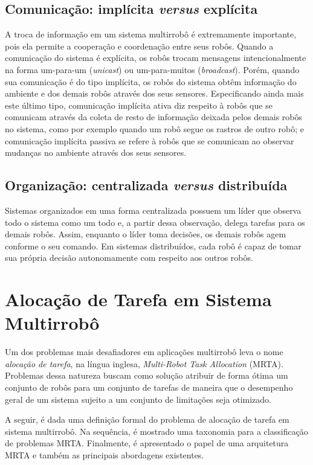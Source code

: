         \subsection{Comunicação: implícita \textit{versus} explícita}
            A troca de informação em um sistema multirrobô é extremamente importante, pois ela permite a cooperação e coordenação entre seus robôs. Quando a comunicação do sistema é explícita, os robôs trocam mensagens intencionalmente na forma um-para-um (\textit{unicast}) ou um-para-muitos (\textit{broadcast}). Porém, quando sua comunicação é do tipo implícita, os robôs do sistema obtêm informação do ambiente e dos demais robôs através dos seus sensores. Especificando ainda mais este último tipo, comunicação implícita ativa diz respeito à robôs que se comunicam através da coleta de resto de informação deixada pelos demais robôs no sistema, como por exemplo quando um robô segue os rastros de outro robô; e comunicação implícita passiva se refere à robôs que se comunicam ao observar mudanças no ambiente através dos seus sensores.
        
        \subsection{Organização: centralizada \textit{versus} distribuída}
            Sistemas organizados em uma forma centralizada possuem um líder que observa todo o sistema como um todo e, a partir dessa observação, delega tarefas para os demais robôs. Assim, enquanto o líder toma decisões, os demais robôs agem conforme o seu comando. Em sistemas distribuídos, cada robô é capaz de tomar sua própria decisão autonomamente com respeito aos outros robôs. 
    
    \section{Alocação de Tarefa em Sistema Multirrobô} \label{sec:mrta}
        Um dos problemas mais desafiadores em aplicações multirrobô leva o nome \textit{alocação de tarefa}, na língua inglesa, \textit{Multi-Robot Task Allocation} (MRTA). Problemas dessa natureza buscam como solução atribuir de forma ótima um conjunto de robôs para um conjunto de tarefas de maneira que o desempenho geral de um sistema sujeito a um conjunto de limitações seja otimizado.
        
        A seguir, é dada uma definição formal do problema de alocação de tarefa em sistema multirrobô. Na sequência, é mostrado uma taxonomia para a classificação de problemas MRTA. Finalmente, é apresentado o papel de uma arquitetura MRTA e também as principais abordagens existentes.
        
